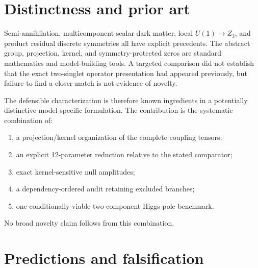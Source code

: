 \documentclass[
]{article}
\providecommand{\tightlist}{%
  \setlength{\itemsep}{0pt}\setlength{\parskip}{0pt}}
\begin{document}
\hypertarget{distinctness-and-prior-art}{%
\section{Distinctness and prior art}\label{distinctness-and-prior-art}}

Semi-annihilation, multicomponent scalar dark matter, local
\(U(1)\to Z_3\), and product residual discrete symmetries all have
explicit precedents. The abstract group, projection, kernel, and
symmetry-protected zeros are standard mathematics and model-building
tools. A targeted comparison did not establish that the exact
two-singlet operator presentation had appeared previously, but failure
to find a closer match is not evidence of novelty.

The defensible characterization is therefore known ingredients in a
potentially distinctive model-specific formulation. The contribution is
the systematic combination of:

\begin{enumerate}
\def\labelenumi{\arabic{enumi}.}
\tightlist
\item
  a projection/kernel organization of the complete coupling tensors;
\item
  an explicit 12-parameter reduction relative to the stated comparator;
\item
  exact kernel-sensitive null amplitudes;
\item
  a dependency-ordered audit retaining excluded branches;
\item
  one conditionally viable two-component Higgs-pole benchmark.
\end{enumerate}

No broad novelty claim follows from this combination.

\hypertarget{predictions-and-falsification}{%
\section{Predictions and
falsification}\label{predictions-and-falsification}}
\end{document}
